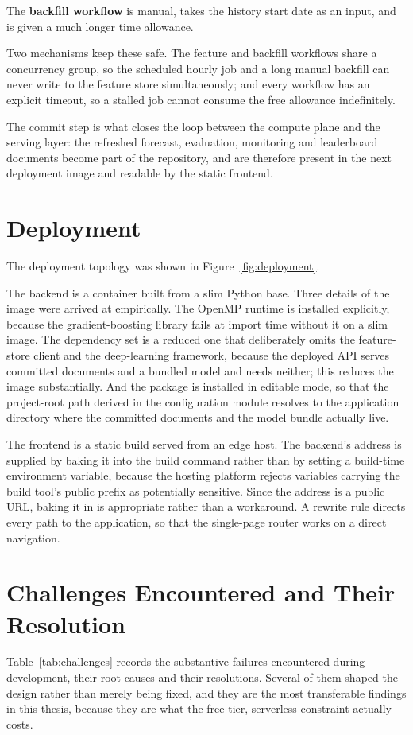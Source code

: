 The \textbf{backfill workflow} is manual, takes the history start date as an
input, and is given a much longer time allowance.

Two mechanisms keep these safe. The feature and backfill workflows share a
concurrency group, so the scheduled hourly job and a long manual backfill can
never write to the feature store simultaneously; and every workflow has an
explicit timeout, so a stalled job cannot consume the free allowance indefinitely.

The commit step is what closes the loop between the compute plane and the serving
layer: the refreshed forecast, evaluation, monitoring and leaderboard documents
become part of the repository, and are therefore present in the next deployment
image and readable by the static frontend.

\section{Deployment}
\label{sec:impl-deploy}
The deployment topology was shown in Figure~\ref{fig:deployment}.

The backend is a container built from a slim Python base. Three details of the
image were arrived at empirically. The OpenMP runtime is installed explicitly,
because the gradient-boosting library fails at import time without it on a slim
image. The dependency set is a reduced one that deliberately omits the
feature-store client and the deep-learning framework, because the deployed API
serves committed documents and a bundled model and needs neither; this reduces the
image substantially. And the package is installed in editable mode, so that the
project-root path derived in the configuration module resolves to the application
directory where the committed documents and the model bundle actually live.

The frontend is a static build served from an edge host. The backend's address is
supplied by baking it into the build command rather than by setting a build-time
environment variable, because the hosting platform rejects variables carrying the
build tool's public prefix as potentially sensitive. Since the address is a public
URL, baking it in is appropriate rather than a workaround. A rewrite rule directs
every path to the application, so that the single-page router works on a direct
navigation.

\section{Challenges Encountered and Their Resolution}
\label{sec:impl-challenges}
Table~\ref{tab:challenges} records the substantive failures encountered during
development, their root causes and their resolutions. Several of them shaped the
design rather than merely being fixed, and they are the most transferable findings
in this thesis, because they are what the free-tier, serverless constraint
actually costs.


